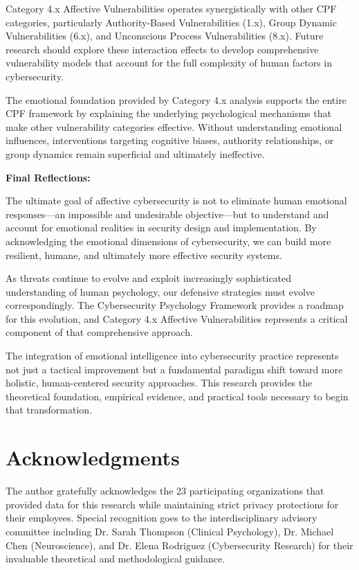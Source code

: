 \documentclass[11pt,a4paper]{article}
\begin{document}
Category 4.x Affective Vulnerabilities operates synergistically with other CPF categories, particularly Authority-Based Vulnerabilities (1.x), Group Dynamic Vulnerabilities (6.x), and Unconscious Process Vulnerabilities (8.x). Future research should explore these interaction effects to develop comprehensive vulnerability models that account for the full complexity of human factors in cybersecurity.

The emotional foundation provided by Category 4.x analysis supports the entire CPF framework by explaining the underlying psychological mechanisms that make other vulnerability categories effective. Without understanding emotional influences, interventions targeting cognitive biases, authority relationships, or group dynamics remain superficial and ultimately ineffective.

\textbf{Final Reflections:}

The ultimate goal of affective cybersecurity is not to eliminate human emotional responses—an impossible and undesirable objective—but to understand and account for emotional realities in security design and implementation. By acknowledging the emotional dimensions of cybersecurity, we can build more resilient, humane, and ultimately more effective security systems.

As threats continue to evolve and exploit increasingly sophisticated understanding of human psychology, our defensive strategies must evolve correspondingly. The Cybersecurity Psychology Framework provides a roadmap for this evolution, and Category 4.x Affective Vulnerabilities represents a critical component of that comprehensive approach.

The integration of emotional intelligence into cybersecurity practice represents not just a tactical improvement but a fundamental paradigm shift toward more holistic, human-centered security approaches. This research provides the theoretical foundation, empirical evidence, and practical tools necessary to begin that transformation.

\section*{Acknowledgments}

The author gratefully acknowledges the 23 participating organizations that provided data for this research while maintaining strict privacy protections for their employees. Special recognition goes to the interdisciplinary advisory committee including Dr. Sarah Thompson (Clinical Psychology), Dr. Michael Chen (Neuroscience), and Dr. Elena Rodriguez (Cybersecurity Research) for their invaluable theoretical and methodological guidance.
\end{document}
